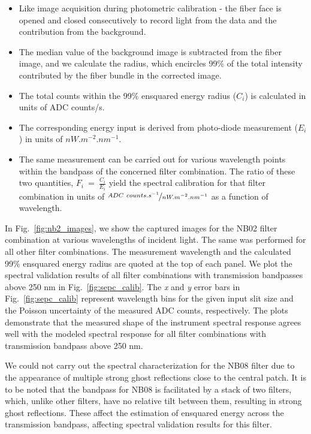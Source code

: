  \begin{itemize}
 \item Like image acquisition during photometric calibration - the fiber face is opened and closed consecutively to record light from the data and the contribution from the background.
 \item The median value of the background image is subtracted from the fiber image, and we calculate the radius, which encircles 99\% of the total intensity contributed by the fiber bundle in the corrected image.
 \item The total counts within the 99\% ensquared energy radius ($C_{i}$) is calculated in units of ADC counts/s.
 \item The corresponding energy input is derived from photo-diode measurement ($E_{i}$) in units of $nW.m^{-2}.nm^{-1}$.
 \item The same measurement can be carried out for various wavelength points within the bandpass of the concerned filter combination. The ratio of these two quantities, $F_{i}~=~\frac{C_{i}}{E_{i}}$ yield the spectral calibration for that filter combination in units of $\nicefrac{ADC~counts.s^{-1}}{nW.m^{-2}.nm^{-1}}$ as a function of wavelength.
 \end{itemize}

In Fig.~\ref{fig:nb2_images}, we show the captured images for the NB02 filter combination at various wavelengths of incident light. The same was performed for all other filter combinations. The measurement wavelength and the calculated 99\% ensquared energy radius are quoted at the top of each panel. We plot the spectral validation results of all filter combinations with transmission bandpasses above 250 nm in Fig.~\ref{fig:sepc_calib}. The \textit{x} and \textit{y} error bars in Fig.~\ref{fig:sepc_calib} represent wavelength bins for the given input slit size and the Poisson uncertainty of the measured ADC counts, respectively. The plots demonstrate that the measured shape of the instrument spectral response agrees well with the modeled spectral response for all filter combinations with transmission bandpass above 250 nm.

We could not carry out the spectral characterization for the NB08 filter due to the appearance of multiple strong ghost reflections close to the central patch. It is to be noted that the bandpass for NB08 is facilitated by a stack of two filters, which, unlike other filters, have no relative tilt between them, resulting in strong ghost reflections. These affect the estimation of ensquared energy across the transmission bandpass, affecting spectral validation results for this filter. 

